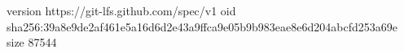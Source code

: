 version https://git-lfs.github.com/spec/v1
oid sha256:39a8e9de2af461e5a16d6d2e43a9ffca9e05b9b983eae8e6d204abcfd253a69e
size 87544
